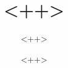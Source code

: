 \documentclass[12pt]{article}
\title{<++>}
\author{<++>}
\date{<++>}
\begin{document}
\maketitle

\vspace{1.5cm}

\renewcommand{\abstractname}{Résumé}
\begin{abstract}
\end{abstract}

\renewcommand{\abstractname}{Abstract}
\begin{abstract}
\end{abstract}

\newpage









\newpage
\printbibliography
\end{document}
